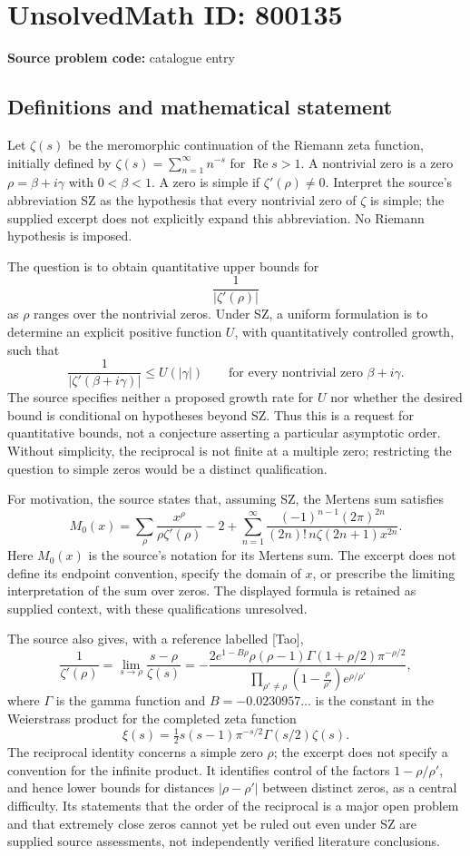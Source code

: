 \documentclass[11pt]{article}
\begin{document}
\section*{UnsolvedMath ID: 800135}
\textbf{Source problem code:} catalogue entry
\subsection{Definitions and mathematical statement}
Let \(\zeta(s)\) be the meromorphic continuation of the Riemann zeta function, initially defined by \(\zeta(s)=\sum_{n=1}^{\infty}n^{-s}\) for \(\operatorname{Re}s>1\). A nontrivial zero is a zero \(\rho=\beta+i\gamma\) with \(0<\beta<1\). A zero is simple if \(\zeta'(\rho)\ne0\). Interpret the source's abbreviation SZ as the hypothesis that every nontrivial zero of \(\zeta\) is simple; the supplied excerpt does not explicitly expand this abbreviation. No Riemann hypothesis is imposed.

The question is to obtain quantitative upper bounds for
\[
\frac{1}{|\zeta'(\rho)|}
\]
as \(\rho\) ranges over the nontrivial zeros. Under SZ, a uniform formulation is to determine an explicit positive function \(U\), with quantitatively controlled growth, such that
\[
\frac{1}{|\zeta'(\beta+i\gamma)|}\le U(|\gamma|)
\qquad\text{for every nontrivial zero }\beta+i\gamma.
\]
The source specifies neither a proposed growth rate for \(U\) nor whether the desired bound is conditional on hypotheses beyond SZ. Thus this is a request for quantitative bounds, not a conjecture asserting a particular asymptotic order. Without simplicity, the reciprocal is not finite at a multiple zero; restricting the question to simple zeros would be a distinct qualification.

For motivation, the source states that, assuming SZ, the Mertens sum satisfies
\[
M_0(x)=\sum_{\rho}\frac{x^{\rho}}{\rho\zeta'(\rho)}-2
+\sum_{n=1}^{\infty}\frac{(-1)^{n-1}(2\pi)^{2n}}{(2n)!\,n\zeta(2n+1)x^{2n}}.
\]
Here \(M_0(x)\) is the source's notation for its Mertens sum. The excerpt does not define its endpoint convention, specify the domain of \(x\), or prescribe the limiting interpretation of the sum over zeros. The displayed formula is retained as supplied context, with these qualifications unresolved.

The source also gives, with a reference labelled [Tao],
\[
\frac{1}{\zeta'(\rho)}
=\lim_{s\to\rho}\frac{s-\rho}{\zeta(s)}
=-\frac{2e^{1-B\rho}\rho(\rho-1)\Gamma(1+\rho/2)\pi^{-\rho/2}}
{\displaystyle\prod_{\rho'\ne\rho}\left(1-\frac{\rho}{\rho'}\right)e^{\rho/\rho'}},
\]
where \(\Gamma\) is the gamma function and \(B=-0.0230957\ldots\) is the constant in the Weierstrass product for the completed zeta function
\[
\xi(s)=\tfrac12s(s-1)\pi^{-s/2}\Gamma(s/2)\zeta(s).
\]
The reciprocal identity concerns a simple zero \(\rho\); the excerpt does not specify a convention for the infinite product. It identifies control of the factors \(1-\rho/\rho'\), and hence lower bounds for distances \(|\rho-\rho'|\) between distinct zeros, as a central difficulty. Its statements that the order of the reciprocal is a major open problem and that extremely close zeros cannot yet be ruled out even under SZ are supplied source assessments, not independently verified literature conclusions.
\end{document}
